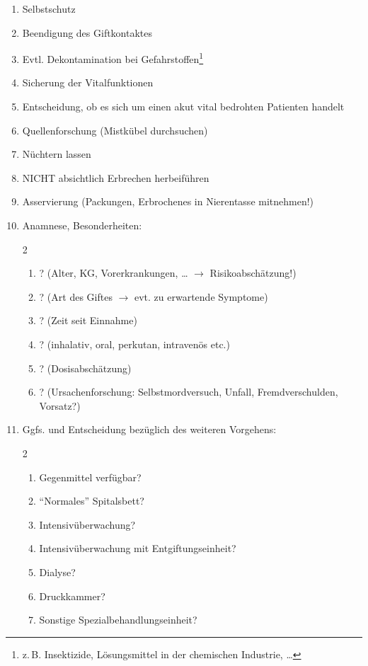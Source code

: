 \label{m:am-vergiftung}
\begin{enumerate}
  \item Selbstschutz
  \item Beendigung des Giftkontaktes
  \item Evtl. Dekontamination bei
  Gefahrstoffen\footnote{z.\,B. Insektizide, Lösungsmittel
  in der chemischen Industrie, \ldots}
  \item Sicherung der Vitalfunktionen
  \item Entscheidung, ob es sich um einen akut vital
  bedrohten Patienten handelt
  \item Quellenforschung (Mistkübel
  durchsuchen)
  \item Nüchtern lassen
  \item NICHT absichtlich Erbrechen
  herbeiführen
  \item Asservierung (Packungen, Erbrochenes in
  Nierentasse mitnehmen!)
  \item Anamnese, Besonderheiten:
  \begin{multicols}{2}
  \begin{enumerate}\raggedbottom
    \item {}? (Alter, KG, Vorerkrankungen, \ldots
    $\rightarrow$ Risikoabschätzung!)
    \item {}? (Art des Giftes $\rightarrow$ evt.
    zu erwartende Symptome)
    \item {}? (Zeit seit Einnahme)
    \item {}?
    (inhalativ, oral, perkutan, intravenös etc.)
    \item {}? (Dosisabschätzung)
    \item {}? (Ursachenforschung:
    Selbst\-mord\-ver\-such, Unfall, Fremdverschulden,
    Vorsatz?)
  \end{enumerate}
  \end{multicols}
  \item Ggfs.  und Entscheidung
  bezüglich des weiteren Vorgehens:
  \begin{multicols}{2}
  \begin{enumerate}\raggedbottom
    \item Gegenmittel verfügbar?
    \item \enquote{Normales} Spitalsbett?
    \item Intensivüberwachung?
    \item Intensivüberwachung mit Entgiftungseinheit?
    \item Dialyse?
    \item Druckkammer?
    \item Sonstige Spezialbehandlungseinheit?
  \end{enumerate}
  \end{multicols}
\end{enumerate}